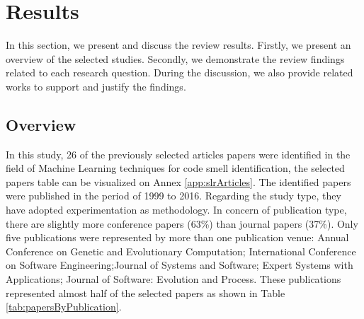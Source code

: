 \section{Results}



In this section, we present and discuss the review results. Firstly, we present an overview of the selected studies. Secondly, we demonstrate the review findings related to each research question. During the discussion, we also provide related works to support and justify the findings.

\subsection{Overview}

In this study, 26 of the previously selected articles papers were identified in the field of Machine Learning techniques for code smell identification, the selected papers table can be visualized on Annex \ref{app:slrArticles}. The identified papers were published in the period of 1999 to 2016.  Regarding the study type, they have adopted experimentation as methodology. In concern of publication type, there are slightly more conference papers (63\%) than journal papers (37\%).  Only five publications were represented by more than one publication venue: Annual Conference on Genetic and Evolutionary Computation; International Conference on Software Engineering;Journal of Systems and Software; Expert Systems with Applications; Journal of Software: Evolution and Process. These publications represented almost half of the selected papers as shown in Table \ref{tab:papersByPublication}.

